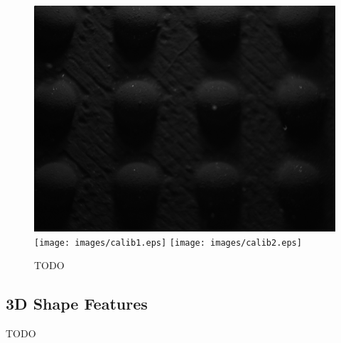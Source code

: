 \documentclass[10pt,twocolumn,letterpaper]{article}
\begin{document}
\begin{figure}[ht]
\includegraphics[width=\textwidth]{images/circle.png}
\endminipage\hfill
{}
\texttt{[image: images/calib1.eps]}
\endminipage\hfill
{}
\texttt{[image: images/calib2.eps]}
\endminipage\\

\caption{TODO}
\end{figure}


\subsection {3D Shape Features}
TODO
\end{document}
